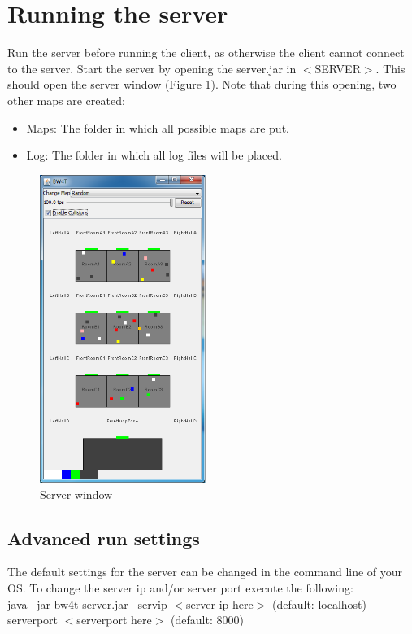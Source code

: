 \documentclass[11pt,a4paper]{article}
\begin{document}
\newpage
\section{Running the server}
Run the server before running the client, as otherwise the client cannot connect to the server. Start the server by opening the server.jar in $<$SERVER$>$. This should open the server window (Figure 1). Note that during this opening, two other maps are created: 
\begin{itemize}
\item Maps: The folder in which all possible maps are put.
\item Log: The folder in which all log files will be placed.
\end{itemize}
\begin{figure}
    \includegraphics[width=0.48\textwidth]{server.png}
    \caption{Server window}
\end{figure}

\subsection{Advanced run settings}
The default settings for the server can be changed in the command line of your OS. To change the server ip and/or server port execute the following:\\

java –jar bw4t-server.jar –servip $<$server ip here$>$ (default: localhost) –serverport $<$serverport here$>$ (default: 8000)\\
\end{document}
